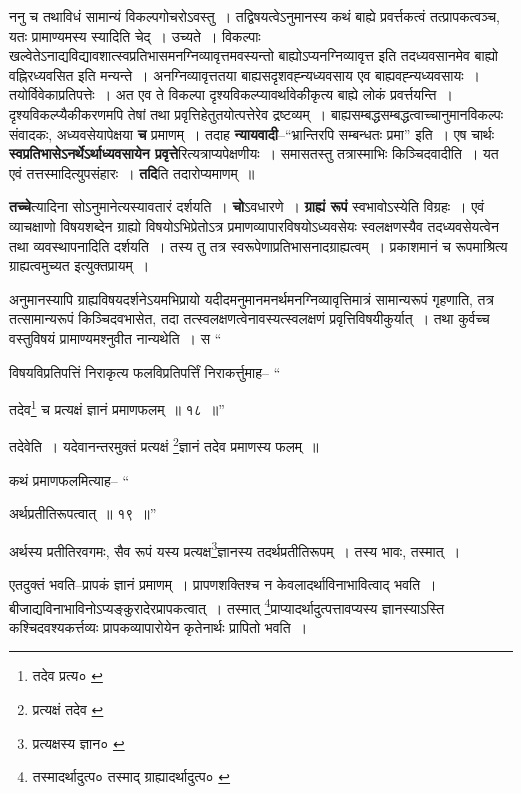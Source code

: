 \documentclass[article,12pt,a4paper]{memoir}
\begin{document}
	  \pstart ननु च तथाविधं सामान्यं विकल्पगोचरोऽवस्तु । तद्विषयत्वेऽनुमानस्य कथं बाह्ये प्रवर्त्तकत्वं तत्प्रापकत्वञ्च, यतः प्रामाण्यमस्य स्यादिति चेद् । उच्यते । विकल्पाः खल्वेतेऽनाद्यविद्यावशात्स्वप्रतिभासमनग्निव्यावृत्तमवस्यन्तो बाह्योऽप्यनग्निव्यावृत्त इति तदध्यवसानमेव बाह्यो वह्निरध्यवसित इति मन्यन्ते । अनग्निव्यावृत्ततया बाह्यसदृशवह्न्यध्यवसाय एव बाह्यवह्न्यध्यवसायः । तयोर्विवेकाप्रतिपत्तेः । अत एव ते विकल्पा दृश्यविकल्प्यावर्थावेकीकृत्य बाह्ये लोकं प्रवर्त्तयन्ति । दृश्यविकल्प्यैकीकरणमपि तेषां तथा प्रवृत्तिहेतुतयोत्पत्तेरेव द्रष्टव्यम् । \leavevmode{} बाह्यसम्बद्धसम्बद्धत्वाच्चानुमानविकल्पः संवादकः, अध्यवसेयापेक्षया \textbf{च} प्रमाणम् । तदाह \textbf{न्यायवादी}--“भ्रान्तिरपि सम्बन्धतः प्रमा” इति । एष चार्थः \textbf{स्वप्रतिभासेऽनर्थेऽर्थाध्यवसायेन प्रवृत्ते}रित्यत्राप्यपेक्षणीयः । समासतस्तु तत्रास्माभिः किञ्चिदवादीति । यत एवं तत्तस्मादित्युपसंहारः । \textbf{तदि}ति तदारोप्यमाणम् ॥
	\pend
      

	  \pstart \textbf{तच्चे}त्यादिना सोऽनुमानेत्यस्यावतारं दर्शयति । \textbf{चो}ऽवधारणे । \textbf{ग्राह्यं रूपं} स्वभावोऽस्येति विग्रहः । एवं व्याचक्षाणो विषयशब्देन ग्राह्यो विषयोऽभिप्रेतोऽत्र प्रमाणव्यापारविषयोऽध्यवसेयः स्वलक्षणस्यैव तदध्यवसेयत्वेन तथा व्यवस्थापनादिति दर्शयति । तस्य तु तत्र स्वरूपेणाप्रतिभासनादग्राह्यत्वम् । प्रकाशमानं च रूपमाश्रित्य ग्राह्यत्वमुच्यत इत्युक्तप्रायम् ।
	\pend
      

	  \pstart अनुमानस्यापि ग्राह्यविषयदर्शनेऽयमभिप्रायो यदीदमनुमानमनर्थमनग्निव्यावृत्तिमात्रं सामान्यरूपं गृहणाति, तत्र तत्सामान्यरूपं किञ्चिदवभासेत, तदा तत्स्वलक्षणत्वेनावस्यत्स्वलक्षणं प्रवृत्तिविषयीकुर्यात् । तथा कुर्वच्च वस्तुविषयं प्रामाण्यमश्नुवीत नान्यथेति । स \leavevmode{} “
	  
	विषयविप्रतिपत्तिं निराकृत्य फलविप्रतिपर्त्तिं निराकर्त्तुमाह-- “
	  
	तदेव\footnote{तदेव प्रत्य० \cite{dp-msC}} च प्रत्यक्षं ज्ञानं प्रमाणफलम् ॥ १८ ॥” 
	  
	तदेवेति । यदेवानन्तरमुक्तं प्रत्यक्षं \footnote{प्रत्यक्षं तदेव \cite{dp-msA} \cite{dp-msB} \cite{dp-edP} \cite{dp-edH} \cite{dp-edE}}\-ज्ञानं तदेव प्रमाणस्य फलम् ॥ 
	  
	कथं प्रमाणफलमित्याह-- “
	  
	अर्थप्रतीतिरूपत्वात् ॥ १९ ॥” 
	  
	अर्थस्य प्रतीतिरवगमः, सैव रूपं यस्य प्रत्यक्ष\footnote{प्रत्यक्षस्य ज्ञान० \cite{dp-msD}}\-ज्ञानस्य तदर्थप्रतीतिरूपम् । तस्य भावः, तस्मात् । 
	  
	एतदुक्तं भवति--प्रापकं ज्ञानं प्रमाणम् । प्रापणशक्तिश्च न केवलादर्थाविनाभावित्वाद् भवति । बीजाद्यविनाभाविनोऽप्यङ्कुरादेरप्रापकत्वात् । तस्मात् \footnote{तस्मादर्थादुत्प० \cite{dp-msA} \cite{dp-edP} \cite{dp-edH} \cite{dp-edE} तस्माद् ग्राह्यादर्थादुत्प० \cite{dp-edN}}\-प्राप्यादर्थादुत्पत्तावप्यस्य ज्ञानस्याऽस्ति कश्चिदवश्यकर्त्तव्यः प्रापकव्यापारोयेन कृतेनार्थः प्रापितो भवति । 
	  
\end{document}
